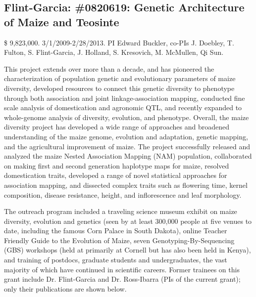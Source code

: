 \subsection*{Flint-Garcia: \#0820619: Genetic Architecture of Maize and Teosinte}
\$ 9,823,000. 3/1/2009-2/28/2013. PI Edward Buckler, co-PIs J. Doebley, T. Fulton, S. Flint-Garcia, J. Holland, S. Kresovich, M. McMullen, Qi Sun. 
\par{}  This project extends over more than a decade, and has pioneered the characterization of population genetic and evolutionary parameters of maize diversity, developed resources to connect this genetic diversity to phenotype through both association and joint linkage-association mapping, conducted fine scale analysis of domestication and agronomic QTL, and recently expanded to whole-genome analysis of diversity, evolution, and phenotype. Overall, the maize diversity project has developed a wide range of approaches and broadened understanding of the maize genome, evolution and adaptation, genetic mapping, and the agricultural improvement of maize. The project successfully released and analyzed the maize Nested Association Mapping (NAM) population, collaborated on making first and second generation haplotype maps for maize, resolved domestication traits, developed a range of novel statistical approaches for association mapping, and dissected complex traits such as flowering time, kernel composition, disease resistance, height, and inflorescence and leaf morphology. 
\par{} The outreach program included a traveling science museum exhibit on maize diversity, evolution and genetics (seen by at least 300,000 people at five venues to date, including the famous Corn Palace in South Dakota), online Teacher Friendly Guide to the Evolution of Maize, seven Genotyping-By-Sequencing (GBS) workshops (held at primarily at Cornell but has also been held in Kenya), and training of postdocs, graduate students and undergraduates, the vast majority of which have continued in scientific careers.  Former trainees on this grant include Dr. Flint-Garcia  and Dr. Ross-Ibarra  (PIs of the current grant); only their publications are shown below.
\par{} \citet{Buckler2009, Flint-Garcia2009, Flint-Garcia2009a, Flint-Garcia2009b, Gore2009, McMullen2009, Ross-Ibarra2009a, Bottoms2010, Dubois2010, Zhang2010a, vanheerwaarden2010a, vanheerwaarden2010b, Brown2011b, Morrell2011a, Studer2011b, vanheerwaarden2011a, Tian2011, Chia2012a, Cook2012a, Fang2012a, Hufford2012b, Hung2012, Hung2012a, Romay2013}
